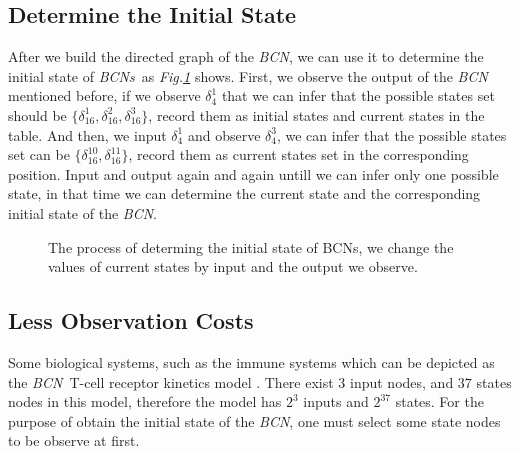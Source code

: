 \documentclass[conference]{IEEEtran} %
\def \BCN {{\em BCN}}
\def \BCNs {{\em BCNs}}
\begin{document}
\subsection{Determine the Initial State}

After we build the directed graph of the {\em BCN}, we can use it to determine the initial state of \BCNs\ as {\em Fig.\ref{fig:5}} shows. First, we observe the output of the {\em BCN} mentioned before, if we observe $\delta_4^1$ that we can infer that the possible states set should be $\{\delta_{16}^1,\delta_{16}^2,\delta_{16}^3\}$, record them as initial states and current states in the table. And then, we input  $\delta_4^1$ and observe  $\delta_4^3$, we can infer that the possible states set can be $\{\delta_{16}^{10},\delta_{16}^{11}\}$, record them as current states set in the corresponding position. Input and output again and again untill we can infer only one  possible state, in that time we can determine the current state and the corresponding initial state of the {\em BCN}.

\begin{figure}[thpb]
      \centering
      
      \caption{The process of determing the initial state of BCNs, we change the values of current states by input and the output we observe. }
      \label{fig:5}
   \end{figure}
\subsection{Less Observation Costs}
Some biological systems, such as the immune systems which can be depicted as the \BCN\ T-cell receptor kinetics model \cite{Klamt2006A}. There exist $3$ input nodes, and $37$ states nodes in this model, therefore the model has $2^3$ inputs and $2^{37}$ states. For the purpose of obtain the initial state of the {\em BCN}, one must select some state nodes to be observe at first. 
\end{document}
